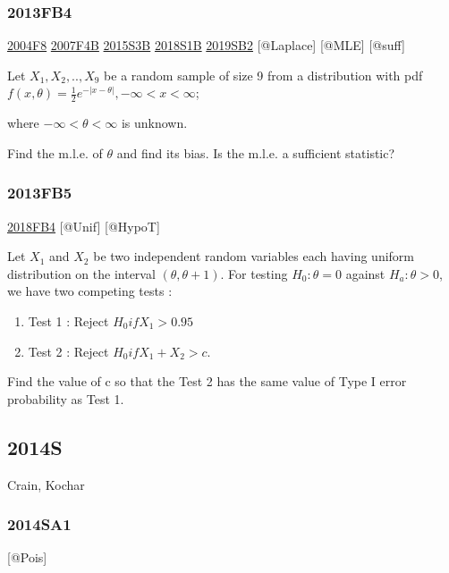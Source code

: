 \documentclass[6pt,Portrait]{article}
\begin{document}
\hypertarget{fb4-2}{%
\subsubsection{2013FB4}\label{fb4-2}}

\protect\hyperlink{f8-2}{2004F8} \protect\hyperlink{f4b}{2007F4B}
\protect\hyperlink{s3b-1}{2015S3B} \protect\hyperlink{s1b-2}{2018S1B}
\protect\hyperlink{sb2-3}{2019SB2} {[}@Laplace{]} {[}@MLE{]} {[}@suff{]}

Let \(X_1,X_2,..,X_9\) be a random sample of size 9 from a distribution
with pdf \(f(x,\theta) =\frac12e^{-|x-\theta|}, -\infty<x<\infty\);

where \(-\infty<\theta<\infty\) is unknown.

Find the m.l.e. of \(\theta\) and find its bias. Is the m.l.e. a
sufficient statistic?

\hypertarget{fb5}{%
\subsubsection{2013FB5}\label{fb5}}

\protect\hyperlink{fb4-4}{2018FB4} {[}@Unif{]} {[}@HypoT{]}

Let \(X_1\) and \(X_2\) be two independent random variables each having
uniform distribution on the interval \((\theta,\theta+1)\). For testing
\(H_0:\theta=0\) against \(H_a:\theta> 0\), we have two competing tests
:

\begin{enumerate}
\def\labelenumi{\arabic{enumi}.}
\item
  Test 1 : Reject \(H_0 if X_1>0.95\)
\item
  Test 2 : Reject \(H_0 if X_1+X_2>c\).
\end{enumerate}

Find the value of c so that the Test 2 has the same value of Type I
error probability as Test 1.

\hypertarget{s-7}{%
\subsection{2014S}\label{s-7}}

Crain, Kochar

\hypertarget{sa1-2}{%
\subsubsection{2014SA1}\label{sa1-2}}

{[}@Pois{]}
\end{document}
